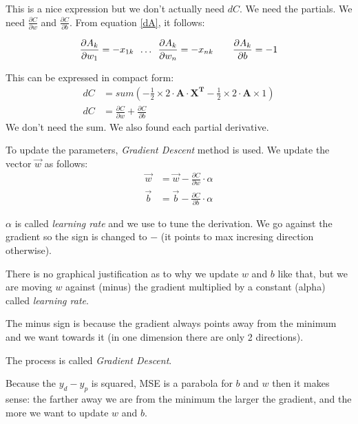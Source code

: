 This is a nice expression but we don't actually need $dC$. We need the partials. We need $\frac{\partial C}{\partial w}$ and $\frac{\partial C}{\partial b}$. From equation \ref{dA}, it follows:

\begin{center}
\begin{align*}
  \frac{\partial A_{k}}{\partial w_1} = -x_{1k} \hspace{0.5em} \ldots \hspace{0.5em}\frac{\partial A_{k}}{\partial w_n}= -x_{nk}\hspace{2em} \frac{\partial A_k}{\partial b} = -1
\end{align*} 
\end{center}

This can be expressed in compact form:
\begin{align}
  dC &= sum(-\frac{1}{2}\times{}2\cdot{}\mathbf{A}\cdot{}\mathbf{X^T} -\frac{1}{2}\times{}2\cdot{}\mathbf{A}\times{}1)\\
  dC &= \frac{\partial C}{\partial w} + \frac{\partial C}{\partial b}  \nonumber
\end{align}
We don't need the sum. We also found each partial derivative.

To update the parameters, \textit{Gradient Descent} method is used. We update the vector $\vec{w}$ as follows:
\begin{align}
  \vec{w} &= \vec{w} -\frac{\partial C}{\partial w}\cdot{}\alpha\\
  \vec{b} &= \vec{b} -\frac{\partial C}{\partial b}\cdot{}\alpha
\end{align}

$\alpha$ is called \textit{learning rate} and we use to tune the derivation. We go against the gradient so the sign is changed to $-$ (it points to max incresing direction otherwise).

There is no graphical justification as to why we update $w$ and $b$ like that, but we are moving $w$ against (minus) the gradient multiplied by a constant (alpha) called \textit{learning rate}.

The minus sign is because the gradient always points away from the minimum and we want towards it (in one dimension there are only 2 directions). 

The process is called \textit{Gradient Descent}.

Because the $y_d - y_p$ is squared, MSE is a parabola for $b$ and $w$ then it makes sense: the farther away we are from the minimum the larger the gradient, and the more we want to update $w$ and $b$.




